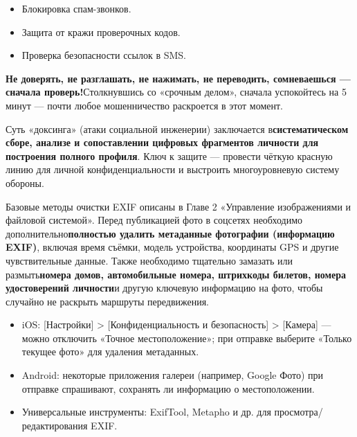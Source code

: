 
\begin{itemize}
  \item Блокировка спам-звонков.
  \item Защита от кражи проверочных кодов.
  \item Проверка безопасности ссылок в SMS.
\end{itemize}


\textbf{Не доверять, не разглашать, не нажимать, не переводить, сомневаешься — сначала проверь!}Столкнувшись со «срочным делом», сначала успокойтесь на 5 минут — почти любое мошенничество раскроется в этот момент.


Суть «доксинга» (атаки социальной инженерии) заключается в\textbf{систематическом сборе, анализе и сопоставлении цифровых фрагментов личности для построения полного профиля}. Ключ к защите — провести чёткую красную линию для личной конфиденциальности и выстроить многоуровневую систему обороны.


Базовые методы очистки EXIF описаны в Главе 2 «Управление изображениями и файловой системой». Перед публикацией фото в соцсетях необходимо дополнительно\textbf{полностью удалить метаданные фотографии (информацию EXIF)}, включая время съёмки, модель устройства, координаты GPS и другие чувствительные данные. Также необходимо тщательно замазать или размыть\textbf{номера домов, автомобильные номера, штрихкоды билетов, номера удостоверений личности}и другую ключевую информацию на фото, чтобы случайно не раскрыть маршруты передвижения.

\begin{itemize}
  \item iOS: [Настройки] > [Конфиденциальность и безопасность] > [Камера] — можно отключить «Точное местоположение»; при отправке выберите «Только текущее фото» для удаления метаданных.
  \item Android: некоторые приложения галереи (например, Google Фото) при отправке спрашивают, сохранять ли информацию о местоположении.
  \item Универсальные инструменты: ExifTool, Metapho и др. для просмотра/редактирования EXIF.
\end{itemize}

